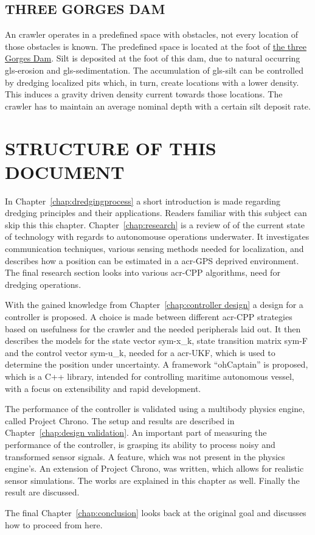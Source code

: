 \subsection{THREE GORGES DAM}\label{sec:usecase3}
An crawler operates in a predefined space with obstacles, not every location of those obstacles is known. The
predefined space is located at the foot of \href{https://www.google.nl/maps/place/Three+Gorges+Dam/@30.8263416,111
.0118356,16z/data=!4m2!3m1!1s0x368476d5e9a340d9:0xa017b4d524bd9d6c}{the three Gorges Dam}. Silt is deposited at the foot
of this dam, due to natural occurring \gls{gls-erosion} and \gls{gls-sedimentation}. The accumulation of
\gls{gls-silt} can be controlled by dredging localized pits which, in turn, create locations with a 
lower density.
This induces a gravity driven density current towards those locations. The crawler has to maintain an average nominal
depth with a certain silt deposit rate.

\section{STRUCTURE OF THIS DOCUMENT}\label{sec:structure of this document}

In Chapter~\ref{chap:dredgingprocess} a short introduction is made regarding dredging principles and their 
applications. Readers familiar with this subject can skip this this chapter. Chapter~\ref{chap:research} is a review 
of of the current state of technology with regards to autonomouse operations underwater. It investigates 
communication techniques, various sensing methods needed for localization, and describes how a position can be 
estimated in a \gls{acr-GPS} deprived environment. The final research section looks into various \gls{acr-CPP} 
algorithms, need for dredging operations.

With the gained knowledge from Chapter~\ref{chap:controller design} a design for a controller is proposed. A choice 
is made between different \gls{acr-CPP} strategies based on usefulness for the crawler and the needed peripherals 
laid out. It then describes the models for the state vector \gls{sym-x_k}, state transition matrix \gls{sym-F} and the
control vector \gls{sym-u_k}, needed for a \gls{acr-UKF}, which is used to determine the position under uncertainty. 
A framework ``ohCaptain'' is proposed, which is a C++ library, intended for controlling maritime autonomous vessel, 
with a focus on extensibility and rapid development.

The performance of the controller is validated using a multibody physics engine, called Project Chrono. The setup and
results are described in Chapter~\ref{chap:design validation}. An important part of measuring the performance of the 
controller, is grasping its ability to process noisy and transformed sensor signals. A feature, which was not present
in the physics engine's. An extension of Project Chrono, was written, which allows for realistic sensor simulations. 
The works are explained in this chapter as well. Finally the result are discussed.

\nodindent The final Chapter~\ref{chap:conclusion} looks back at the original goal and discusses how to proceed from 
here.
\glsresetall
\clearpage